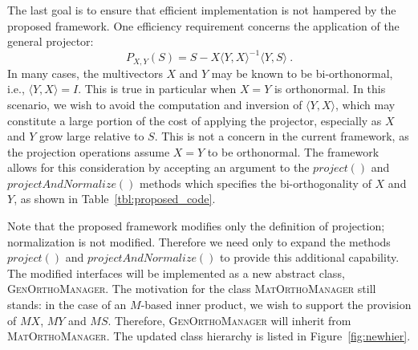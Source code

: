 \documentclass[12pt,letterpaper]{SANDreport}
\theoremstyle{example}
\newcommand{\inner}[2]{\langle #1,#2 \rangle}
\begin{document}
The last goal is to ensure that efficient implementation is not hampered by the proposed
framework. One efficiency requirement concerns the application of the general projector:
\[
P_{X,Y} (S) = S - X \inner{Y}{X}^{-1} \inner{Y}{S}\ .
\]
In many cases, the multivectors $X$ and $Y$ may be known to be bi-orthonormal, i.e.,
$\inner{Y}{X} = I$. This is true in particular when $X=Y$ is orthonormal. In this
scenario, we wish to avoid the computation and inversion of $\inner{Y}{X}$, which may
constitute a large portion of the cost of applying the projector, especially as $X$ and
$Y$ grow large relative to $S$. This is not a concern in the current framework, as the
projection operations assume $X=Y$ to be orthonormal. The framework allows for this
consideration by accepting an argument to the $project()$ and $projectAndNormalize()$
methods which specifies the bi-orthogonality of $X$ and $Y$, as shown in
Table~\ref{tbl:proposed_code}.

Note that the proposed framework modifies only the definition of projection; normalization
is not modified. Therefore we need only to expand the methods $project()$ and
$projectAndNormalize()$ to provide this additional capability. The modified interfaces
will be implemented as a new abstract class, \textsc{GenOrthoManager}.  The motivation for
the class \textsc{MatOrthoManager} still stands: in the case of an $M$-based inner
product, we wish to support the provision of $MX$, $MY$ and $MS$.  Therefore,
\textsc{GenOrthoManager} will inherit from \textsc{MatOrthoManager}.  The updated class
hierarchy is listed in Figure~\ref{fig:newhier}.
\end{document}
